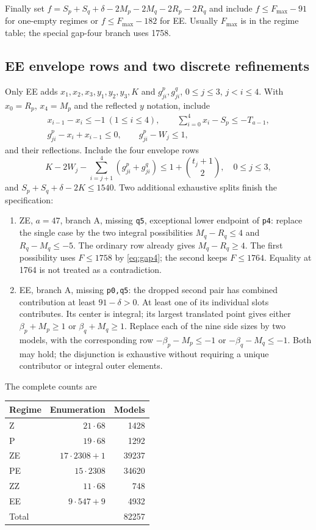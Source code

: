 \documentclass[11pt,a4paper]{article}
\begin{document}
Finally set
$f=S_p+S_q+\delta-2M_p-2M_q-2R_p-2R_q$ and include
$f\le F_{\max}-91$ for one-empty regimes or
$f\le F_{\max}-182$ for EE. Usually $F_{\max}$ is in the regime table;
the special gap-four branch uses 1758.

\subsection{EE envelope rows and two discrete refinements}
Only EE adds $x_1,x_2,x_3,y_1,y_2,y_3,K$ and
$g^p_{ji},g^q_{ji}$, $0\le j\le3$, $j<i\le4$.
With $x_0=R_p$, $x_4=M_p$ and the reflected $y$ notation, include
\begin{gather*}
 x_{i-1}-x_i\le-1\ (1\le i\le4),\qquad
 \sum_{i=0}^4x_i-S_p\le-T_{a-1},\\
 g^p_{ji}-x_i+x_{i-1}\le0,\qquad g^p_{ji}-W_j\le1,
\end{gather*}
and their reflections. Include the four envelope rows
\[
 K-2W_j-\sum_{i=j+1}^4(g^p_{ji}+g^q_{ji})
 \le1+\binom{t_j+1}{2},\quad0\le j\le3,
\]
and $S_p+S_q+\delta-2K\le1540$.
Two additional exhaustive splits finish the specification:
\begin{enumerate}
\item ZE, $a=47$, branch A, missing \texttt{q5}, exceptional lower
endpoint of \texttt{p4}: replace the single case by the two integral
possibilities $M_q-R_q\le4$ and $R_q-M_q\le-5$.
The ordinary row already gives $M_q-R_q\ge4$.
The first possibility uses $F\le1758$ by \eqref{eq:gap4}; the second
keeps $F\le1764$. Equality at 1764 is not treated as a contradiction.
\item EE, branch A, missing \texttt{p0,q5}: the dropped second pair has
combined contribution at least $91-\delta>0$.
At least one of its individual slots contributes. Its center is integral;
its largest translated point gives either
$\beta_p+M_p\ge1$ or $\beta_q+M_q\ge1$.
Replace each of the nine side sizes by two models, with the corresponding
row $-\beta_p-M_p\le-1$ or $-\beta_q-M_q\le-1$.
Both may hold; the disjunction is exhaustive without requiring a unique
contributor or integral outer elements.
\end{enumerate}
The complete counts are
\begin{center}
\begin{tabular}{lrr}
\toprule
Regime&Enumeration&Models\\
\midrule
Z&$21\cdot68$&1428\\
P&$19\cdot68$&1292\\
ZE&$17\cdot2308+1$&39237\\
PE&$15\cdot2308$&34620\\
ZZ&$11\cdot68$&748\\
EE&$9\cdot547+9$&4932\\
\midrule
Total&&82257\\
\bottomrule
\end{tabular}
\end{center}
\end{document}
